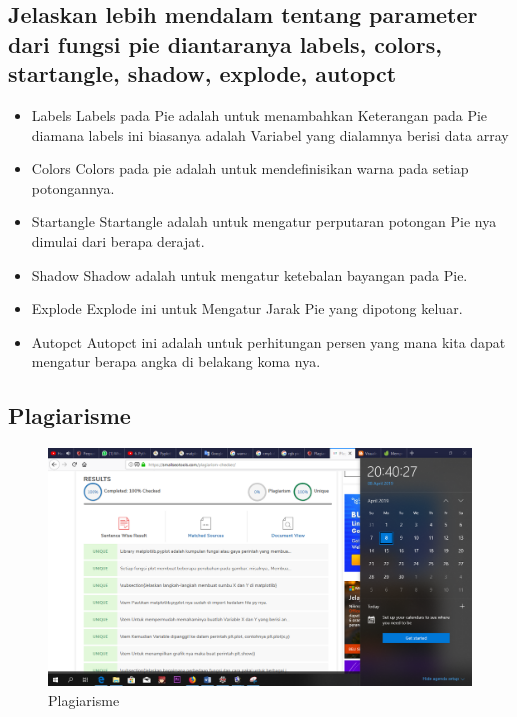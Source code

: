\subsection{Jelaskan lebih mendalam tentang parameter dari fungsi pie diantaranya labels, colors, startangle, shadow, explode, autopct}
\begin{itemize}
	\item Labels\newline
	Labels pada Pie adalah untuk menambahkan Keterangan pada Pie diamana labels ini biasanya adalah Variabel yang dialamnya berisi data array
	\item Colors\newline
	Colors pada pie adalah untuk mendefinisikan warna pada setiap potongannya.
	\item Startangle\newline
	Startangle adalah untuk mengatur perputaran potongan Pie nya dimulai dari berapa derajat.
	\item Shadow\newline
	Shadow adalah untuk mengatur ketebalan bayangan pada Pie.
	\item Explode\newline
	Explode ini untuk Mengatur Jarak Pie yang dipotong keluar.
	\item Autopct\newline
	Autopct ini adalah untuk perhitungan persen yang mana kita dapat mengatur berapa angka di belakang koma nya. 
\end{itemize}

\subsection{Plagiarisme}
\begin{figure}[h]
\centering
\includegraphics[scale=0.2]{figures/6/Teori/1174002/8april.png}
\caption{Plagiarisme}
\label{fig:plagiat}
\end{figure}


